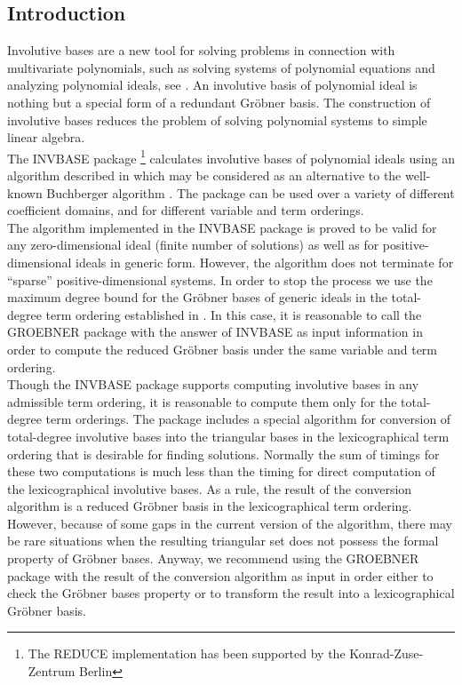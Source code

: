 
\subsection{Introduction}
Involutive bases are a new tool for solving problems in connection with
multivariate polynomials, such as solving systems of polynomial equations
and analyzing polynomial ideals, see \cite{ZharkovBlinkov:93}. An involutive basis of
polynomial ideal is nothing but a special form of a redundant Gr\"obner
basis. The construction of involutive bases reduces the problem of solving
polynomial systems to simple linear algebra.\\
The INVBASE package
\footnote{The REDUCE implementation has been supported by
the Konrad-Zuse-Zentrum Berlin}
calculates involutive bases of polynomial ideals
using an algorithm described in \cite{ZharkovBlinkov:93}
which may be considered as an alternative to
the well-known Buchberger algorithm \cite{Buchberger:85}.
The package can be used over
a variety of different coefficient domains, and for different variable
and term orderings.\\
The algorithm implemented in the INVBASE package is proved
to be valid for any zero-dimensional ideal (finite number of solutions)
as well as for positive-dimensional ideals in generic form. However,
the algorithm does not terminate for ``sparse'' positive-dimensional systems.
In order to stop the process we use the maximum degree
bound for the Gr\"obner bases of generic ideals in the total-degree
term ordering established in \cite{Lazard:83}.
In this case, it is reasonable
to call the GROEBNER package with the answer of INVBASE as input
information in order to compute the reduced Gr\"obner basis under the
same variable and term ordering.\\
Though the INVBASE package supports computing involutive bases in any
admissible term ordering,
it is reasonable to compute them only for the total-degree term
orderings. The package includes a special algorithm for conversion
of total-degree involutive bases into the triangular bases
in the lexicographical term ordering that is desirable for
finding solutions. Normally the sum of timings for these two
computations is much less than the timing for direct computation
of the lexicographical involutive bases. As a rule, the result
of the conversion algorithm is a reduced Gr\"obner basis in the
lexicographical term ordering. However, because of some gaps in
the current version of the algorithm,
there may be rare situations when the resulting triangular set
does not possess the formal property of Gr\"obner bases.
Anyway, we recommend using the GROEBNER package with the result
of the conversion algorithm as input in order either to check
the Gr\"obner bases property or to transform the result into a
lexicographical Gr\"obner basis.
